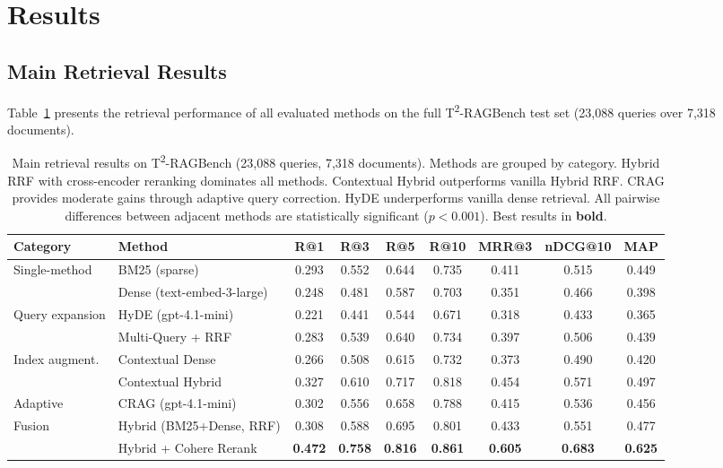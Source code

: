\documentclass[11pt]{article}
\begin{document}
\section{Results}
\label{sec:results}

\subsection{Main Retrieval Results}
\label{sec:main_results}

Table~\ref{tab:main_results} presents the retrieval performance of all evaluated methods on the full T\textsuperscript{2}-RAGBench test set (23,088 queries over 7,318 documents).

\begin{table}[t]
\centering
\footnotesize
\begin{tabular}{llccccccc}
\toprule
\textbf{Category} & \textbf{Method} & \textbf{R@1} & \textbf{R@3} & \textbf{R@5} & \textbf{R@10} & \textbf{MRR@3} & \textbf{nDCG@10} & \textbf{MAP} \\
\midrule
\multirow{2}{*}{Single-method}
  & BM25 (sparse)               & 0.293 & 0.552 & 0.644 & 0.735 & 0.411 & 0.515 & 0.449 \\
  & Dense (text-embed-3-large)  & 0.248 & 0.481 & 0.587 & 0.703 & 0.351 & 0.466 & 0.398 \\
\midrule
\multirow{2}{*}{Query expansion}
  & HyDE (gpt-4.1-mini)        & 0.221 & 0.441 & 0.544 & 0.671 & 0.318 & 0.433 & 0.365 \\
  & Multi-Query + RRF           & 0.283 & 0.539 & 0.640 & 0.734 & 0.397 & 0.506 & 0.439 \\
\midrule
\multirow{2}{*}{Index augment.}
  & Contextual Dense            & 0.266 & 0.508 & 0.615 & 0.732 & 0.373 & 0.490 & 0.420 \\
  & Contextual Hybrid           & 0.327 & 0.610 & 0.717 & 0.818 & 0.454 & 0.571 & 0.497 \\
\midrule
Adaptive
  & CRAG (gpt-4.1-mini)         & 0.302 & 0.556 & 0.658 & 0.788 & 0.415 & 0.536 & 0.456 \\
\midrule
\multirow{2}{*}{Fusion}
  & Hybrid (BM25+Dense, RRF)    & 0.308 & 0.588 & 0.695 & 0.801 & 0.433 & 0.551 & 0.477 \\
  & Hybrid + Cohere Rerank      & \textbf{0.472} & \textbf{0.758} & \textbf{0.816} & \textbf{0.861} & \textbf{0.605} & \textbf{0.683} & \textbf{0.625} \\
\bottomrule
\end{tabular}
\caption{Main retrieval results on T\textsuperscript{2}-RAGBench (23,088 queries, 7,318 documents). Methods are grouped by category. Hybrid RRF with cross-encoder reranking dominates all methods. Contextual Hybrid outperforms vanilla Hybrid RRF. CRAG provides moderate gains through adaptive query correction. HyDE underperforms vanilla dense retrieval. All pairwise differences between adjacent methods are statistically significant ($p < 0.001$). Best results in \textbf{bold}.}
\label{tab:main_results}
\end{table}
\end{document}
